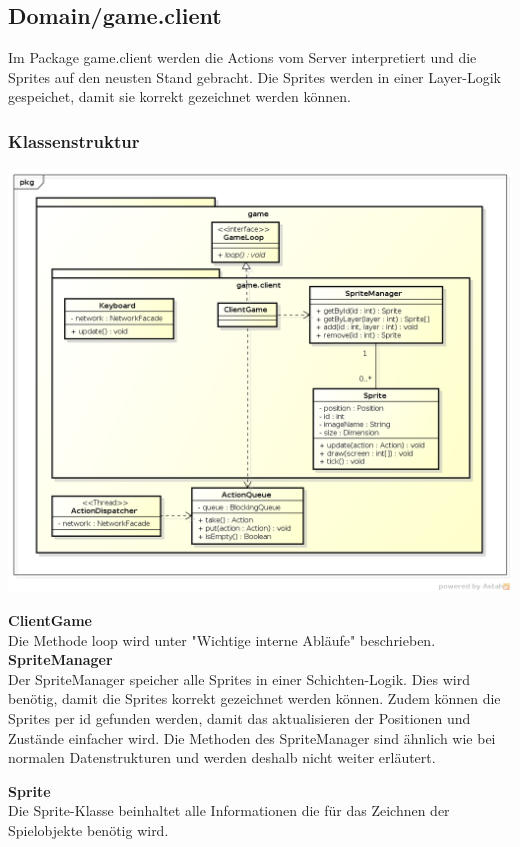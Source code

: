 \documentclass[11pt]{scrartcl}
\begin{document}
\newpage

\subsection{Domain/game.client}
Im Package game.client werden die Actions vom Server interpretiert und die Sprites auf den neusten Stand gebracht. Die Sprites werden in einer Layer-Logik gespeichet, damit sie korrekt gezeichnet werden können.

\subsubsection{Klassenstruktur}
\includegraphics[scale=0.5]{ClassDiagramGameClient}

\textbf{ClientGame}\\
Die Methode loop wird unter "Wichtige interne Abläufe" beschrieben.\\

\textbf{SpriteManager}\\
Der SpriteManager speicher alle Sprites in einer Schichten-Logik. Dies wird benötig, damit die Sprites korrekt gezeichnet werden können. Zudem können die Sprites per id gefunden werden, damit das aktualisieren der Positionen und Zustände einfacher wird. Die Methoden des SpriteManager sind ähnlich wie bei normalen Datenstrukturen und werden deshalb nicht weiter erläutert.

\newpage

\textbf{Sprite}\\
Die Sprite-Klasse beinhaltet alle Informationen die für das Zeichnen der Spielobjekte benötig wird.\\
\end{document}
